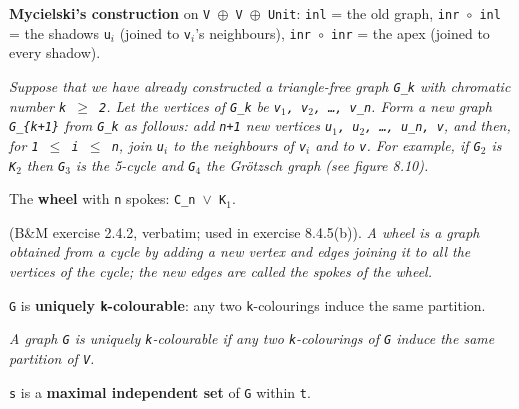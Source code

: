 \begin{definition}[mycielskian]
\label{SimpleGraph.mycielskian}
\leanok
\textbf{Mycielski's construction} on \texttt{V $\oplus$ V $\oplus$ Unit}: \texttt{inl} =
the old graph, \texttt{inr $\circ$ inl} = the
shadows \texttt{u$_{i}$} (joined to \texttt{v$_{i}$}'s neighbours), \texttt{inr $\circ$
inr} = the apex (joined to every shadow).

\emph{Suppose that we have
already constructed a triangle-free graph \texttt{G\_k} with chromatic number \texttt{k
$\ge$ 2}.
Let the vertices of \texttt{G\_k} be \texttt{v$_{1}$, v$_{2}$, \dots{}, v\_n}. Form a
new graph \texttt{G\_\{k+1\}} from
\texttt{G\_k} as follows: add \texttt{n+1} new vertices \texttt{u$_{1}$, u$_{2}$, \dots{}, u\_n, v}, and then, for
\texttt{1 $\le$ i $\le$ n}, join \texttt{u$_{i}$} to the neighbours of \texttt{v$_{i}$} and to \texttt{v}.  For example, if \texttt{G$_{2}$}
is \texttt{K$_{2}$} then \texttt{G$_{3}$} is the 5-cycle and \texttt{G$_{4}$} the
Gr\"otzsch graph (see figure 8.10).}
\end{definition}

\begin{definition}
\label{SimpleGraph.wheel}
\leanok
{}
The \textbf{wheel} with \texttt{n} spokes: \texttt{C\_n $\lor$ K$_{1}$}.

(B\&M exercise 2.4.2, verbatim; used in exercise 8.4.5(b)). \emph{A wheel is a graph
obtained from a cycle by adding a new vertex and edges joining it to all the vertices of
the cycle; the new edges are called the spokes of the wheel.}
\end{definition}

\begin{definition}
\label{SimpleGraph.UniquelyColorable}
\leanok
\texttt{G} is \textbf{uniquely \texttt{k}-colourable}: any two \texttt{k}-colourings induce the same partition.

\emph{A graph \texttt{G} is uniquely
\texttt{k}-colourable if any two \texttt{k}-colourings of \texttt{G} induce the same partition of \texttt{V}.}
\end{definition}

\begin{definition}
\label{SimpleGraph.IsMaximalIndepSetIn}
\leanok
\texttt{s} is a \textbf{maximal independent set} of \texttt{G} within \texttt{t}.
\end{definition}

